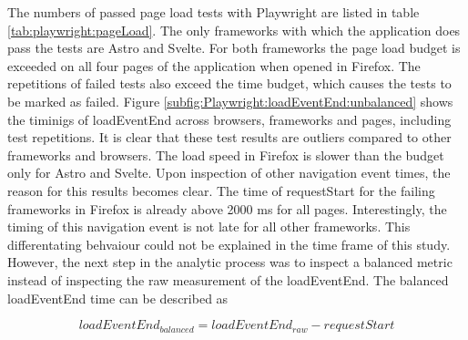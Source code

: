 \documentclass[a4paper, 10pt]{article}
\begin{document}
The numbers of passed page load tests with Playwright are listed in table \ref{tab:playwright:pageLoad}.
The only frameworks with which the application does pass the tests are Astro and Svelte.
For both frameworks the page load budget is exceeded on all four pages of the application when opened in Firefox.
The repetitions of failed tests also exceed the time budget, which causes the tests to be marked as failed.
Figure \ref{subfig:Playwright:loadEventEnd:unbalanced} shows the timinigs of loadEventEnd across browsers, frameworks and pages, including test repetitions.
It is clear that these test results are outliers compared to other frameworks and browsers.
The load speed in Firefox is slower than the budget only for Astro and Svelte.
Upon inspection of other navigation event times, the reason for this results becomes clear.
The time of requestStart for the failing frameworks in Firefox is already above 2000 ms for all pages.
Interestingly, the timing of this navigation event is not late for all other frameworks.
This differentating behvaiour could not be explained in the time frame of this study.
However, the next step in the analytic process was to inspect a balanced metric instead of inspecting the raw measurement of the loadEventEnd.
The balanced loadEventEnd time can be described as

\begin{equation}
\mathit{loadEventEnd}_\mathit{balanced} = \mathit{loadEventEnd}_\mathit{raw} - \mathit{requestStart}
\end{equation}
\end{document}
